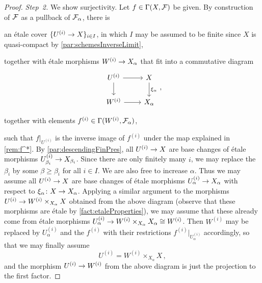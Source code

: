 \documentclass[a4paper, 10pt, oneside, DIV=9, chapterprefix=true, numbers=enddot, bibliography=totoc]{scrbook}
\begin{document}
\begin{proof}
	\emph{Step~2.} We show surjectivity. Let $f\in\operatorname{\Gamma}(X,\mathcal{F})$ be given. By construction of $\mathcal{F}$ as a pullback of $\mathcal{F}_\alpha$, there is
	\begin{numerate}
		\item an étale cover $\{U^{(i)}\morphism X\}_{i\in I}$, in which $I$ may be assumed to be finite since $X$ is quasi-compact by \cref{par:schemesInverseLimit},
		\item together with étale morphisms $W^{(i)}\morphism X_\alpha$ that fit into a commutative diagram
		\begin{equation*}
			\begin{tikzcd}
				U^{(i)}\dar\rar & X\dar["\xi_\alpha"]\\
				W^{(i)}\rar & X_\alpha
			\end{tikzcd}\,,
		\end{equation*}
		\item together with elements $f^{(i)}\in \operatorname{\Gamma}(W^{(i)},\mathcal{F}_\alpha)$,
	\end{numerate}
	such that $f|_{U^{(i)}}$ is the inverse image of $f^{(i)}$ under the map explained in \cref{rem:f^*}. By \cref{par:descendingFinPres}, all $U^{(i)}\morphism X$ are base changes of étale morphisms $U^{(i)}_{\beta_i}\morphism X_{\beta_i}$. Since there are only finitely many $i$, we may replace the $\beta_i$ by some $\beta\geq\beta_i$ for all $i\in I$. We are also free to increase $\alpha$. Thus we may assume all $U^{(i)}\morphism X$ are base changes of étale morphisms $U_\alpha^{(i)}\morphism X_\alpha$ with respect to $\xi_\alpha\colon X\morphism X_\alpha$. Applying a similar argument to the morphisms $U^{(i)}\morphism W^{(i)}\times_{X_\alpha}X$ obtained from the above diagram (observe that these morphisms are étale by \cref{fact:etaleProperties}), we may assume that these already come from étale morphisms $U_\alpha^{(i)}\morphism W^{(i)}\times_{X_\alpha}X_\alpha\cong W^{(i)}$. Then $W^{(i)}$ may be replaced by $U_\alpha^{(i)}$ and the $f^{(i)}$ with their restrictions $f^{(i)}|_{U_\alpha^{(i)}}$ accordingly, so that we may finally assume
	\begin{equation*}
		U^{(i)}=W^{(i)}\times_{X_\alpha}X\,,
	\end{equation*}
	and the morphism $U^{(i)}\morphism W^{(i)}$ from the above diagram is just the projection to the first factor.
	

\end{proof}
\end{document}
